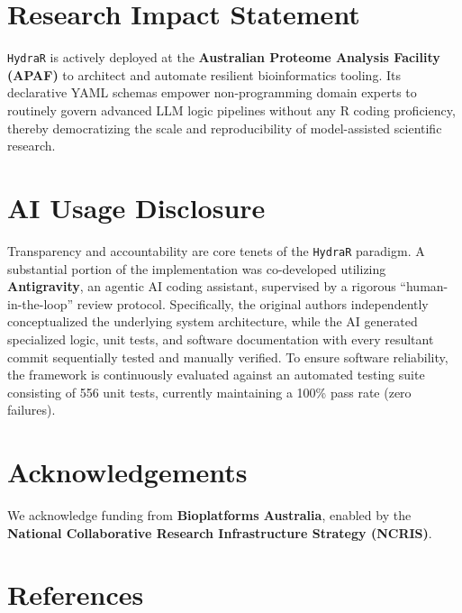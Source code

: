 \documentclass[10pt,a4paper,onecolumn]{article}
\begin{document}
\section{Research Impact Statement}\label{research-impact-statement}

\texttt{HydraR} is actively deployed at the \textbf{Australian Proteome
Analysis Facility (APAF)} to architect and automate resilient
bioinformatics tooling. Its declarative YAML schemas empower
non-programming domain experts to routinely govern advanced LLM logic
pipelines without any R coding proficiency, thereby democratizing the
scale and reproducibility of model-assisted scientific research.

\section{AI Usage Disclosure}\label{ai-usage-disclosure}

Transparency and accountability are core tenets of the \texttt{HydraR}
paradigm. A substantial portion of the implementation was co-developed
utilizing \textbf{Antigravity}, an agentic AI coding assistant,
supervised by a rigorous ``human-in-the-loop'' review protocol.
Specifically, the original authors independently conceptualized the
underlying system architecture, while the AI generated specialized
logic, unit tests, and software documentation with every resultant
commit sequentially tested and manually verified. To ensure software reliability, the framework is continuously evaluated against an automated testing suite consisting of 556 unit tests, currently maintaining a 100\% pass rate (zero failures).

\section{Acknowledgements}\label{acknowledgements}

We acknowledge funding from \textbf{Bioplatforms Australia}, enabled by
the \textbf{National Collaborative Research Infrastructure Strategy
(NCRIS)}.

\section*{References}\label{references}
\end{document}
